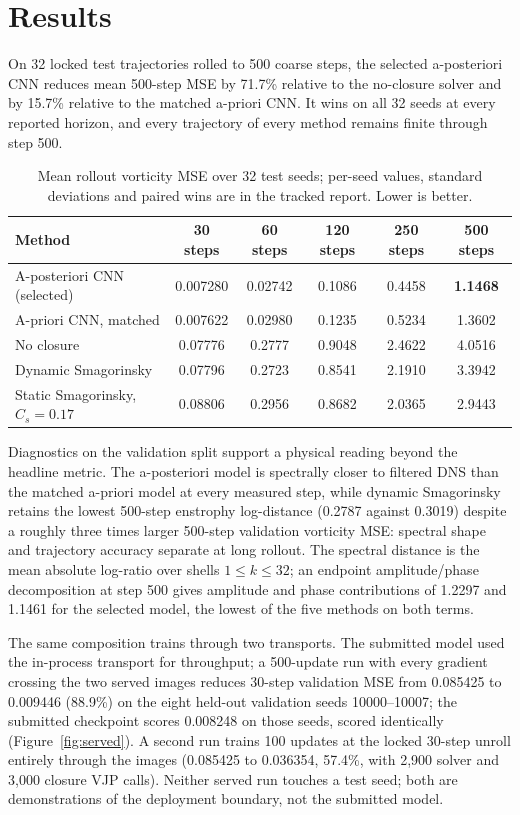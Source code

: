 \documentclass[10pt]{article}
\begin{document}
\section*{Results}

On 32 locked test trajectories rolled to 500 coarse steps, the selected a-posteriori CNN reduces mean 500-step MSE by 71.7\% relative to the no-closure solver and by 15.7\% relative to the matched a-priori CNN. It wins on all 32 seeds at every reported horizon, and every trajectory of every method remains finite through step 500.

\begin{table}[h]
  \centering
  \small
  \begin{tabular}{lccccc}
    \toprule
    Method & 30 steps & 60 steps & 120 steps & 250 steps & 500 steps \\
    \midrule
    A-posteriori CNN (selected) & 0.007280 & 0.02742 & 0.1086 & 0.4458 & \textbf{1.1468} \\
    A-priori CNN, matched        & 0.007622 & 0.02980 & 0.1235 & 0.5234 & 1.3602 \\
    No closure                  & 0.07776  & 0.2777  & 0.9048  & 2.4622  & 4.0516 \\
    Dynamic Smagorinsky         & 0.07796  & 0.2723  & 0.8541  & 2.1910  & 3.3942 \\
    Static Smagorinsky, $C_s{=}0.17$ & 0.08806 & 0.2956 & 0.8682 & 2.0365 & 2.9443 \\
    \bottomrule
  \end{tabular}
  \caption{Mean rollout vorticity MSE over 32 test seeds; per-seed values, standard deviations and paired wins are in the tracked report. Lower is better.}
\end{table}

Diagnostics on the validation split support a physical reading beyond the headline metric. The a-posteriori model is spectrally closer to filtered DNS than the matched a-priori model at every measured step, while dynamic Smagorinsky retains the lowest 500-step enstrophy log-distance (0.2787 against 0.3019) despite a roughly three times larger 500-step validation vorticity MSE: spectral shape and trajectory accuracy separate at long rollout. The spectral distance is the mean absolute log-ratio over shells $1 \le k \le 32$; an endpoint amplitude/phase decomposition at step 500 gives amplitude and phase contributions of 1.2297 and 1.1461 for the selected model, the lowest of the five methods on both terms.

The same composition trains through two transports. The submitted model used the in-process transport for throughput; a 500-update run with every gradient crossing the two served images reduces 30-step validation MSE from 0.085425 to 0.009446 (88.9\%) on the eight held-out validation seeds 10000--10007; the submitted checkpoint scores 0.008248 on those seeds, scored identically (Figure~\ref{fig:served}). A second run trains 100 updates at the locked 30-step unroll entirely through the images (0.085425 to 0.036354, 57.4\%, with 2,900 solver and 3,000 closure VJP calls). Neither served run touches a test seed; both are demonstrations of the deployment boundary, not the submitted model.
\end{document}
